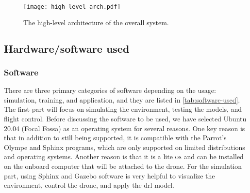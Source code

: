 \documentclass[../main.tex]{subfiles}
\begin{document}
\begin{figure}[tbp]
    \centering
    \texttt{[image: high-level-arch.pdf]}
    \caption{The high-level architecture of the overall system.}
    \label{fig:arch-fig}
\end{figure}

\subsection{Hardware/software used}

\subsubsection{Software}

There are three primary categories of software 
depending on the usage: simulation, training, 
and application, and they are listed in \cref{tab:software-used}. The first part will focus on 
simulating the environment, testing the models, 
and flight control. Before discussing the software 
to be used, we have selected Ubuntu 20.04 (Focal Fossa) 
as an operating system for several reasons. 
One key reason is that in addition to
still being supported, it is compatible with the 
Parrot's Olympe and Sphinx programs, which are only 
supported on limited distributions and operating systems.
Another reason is that it is a lite \textsc{os} 
and can be installed on the onboard computer that 
will be attached to the drone. For the simulation part, 
using Sphinx and Gazebo software is very helpful
to visualize the environment, control the drone, 
and apply the \gls{drl} model. 
\end{document}
